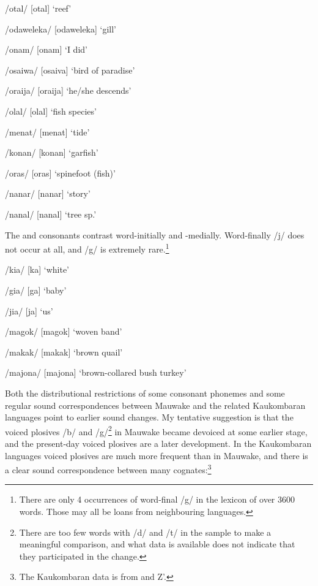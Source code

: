 /otal/  [o{{\textprimstress}tal}]  `reef'

/odaweleka/  [o{{\textprimstress}daweleka}]  `gill'

/onam/  [o{{\textprimstress}nam}]  `I did'

/osaiwa/  [o{{\textprimstress}saiva}]  `bird of paradise'

/oraija/  [o{{\textprimstress}raija}]  `he/she descends'

/olal/  [o{{\textprimstress}lal}]  `fish species'

/menat/  [me{{\textprimstress}nat}]  `tide'

/konan/  [ko{{\textprimstress}nan}]  `garfish'

/oras/  [o{{\textprimstress}ras}]  `spinefoot (fish)'

/nanar/  [na{{\textprimstress}nar}]  `story'

/nanal/  [na{{\textprimstress}nal}]  `tree sp.'

The  and  consonants contrast word-initially and -medially. Word-finally /j/ does not occur at all, and /g/ is extremely rare.\footnote{There are only 4 occurrences of word-final /g/ in the lexicon of over 3600 words. Those may all be loans from neighbouring languages.}

/kia/  [k{\textsci{{\textprimstress}}}a]  `white'

/gia/  [g{\textsci{{\textprimstress}}}a]  `baby'

/jia/  [j{\textsci{{\textprimstress}}}a]  `us'

/magok/  [ma{{\textprimstress}gok}]  `woven band'

/makak/  [ma{{\textprimstress}kak}]  `brown quail'

/majona/  [ma{{\textprimstress}jona}]  `brown-collared bush turkey'

Both the distributional restrictions of some consonant phonemes and some regular sound correspondences between Mauwake and the related Kaukombaran languages point to earlier sound changes. My tentative suggestion is that the voiced plosives /b/ and /g/\footnote{There are too few words with /d/ and /t/ in the sample to make a meaningful comparison, and what data is available does not indicate that they participated in the change.}  in Mauwake became devoiced at some earlier stage, and the present-day voiced plosives are a later development. In the Kaukombaran languages voiced plosives are much more frequent than in Mauwake, and there is a clear sound correspondence between many cognates:\footnote{The Kaukombaran data is from \citet{LoewekeEtAlms} and Z'\citet{Graggen1980}.} 

